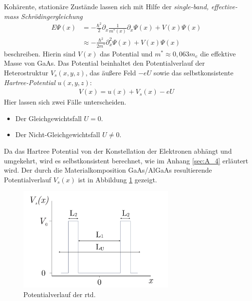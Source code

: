 Kohärente, stationäre Zustände lassen sich mit Hilfe der \emph{single-band, effective-mass Schrödingergleichung} \cite{frensley3}
\begin{equation}
  \begin{aligned}
    E\Psi(x) &= -\frac{\hbar^2}{2}\partial_x \frac{1}{m^*(x)}\partial_x\Psi(x) + V(x)\Psi(x)    \\
    &\approx -\frac{\hbar^2}{2m^*}\partial_x^2\Psi(x) + V(x)\Psi(x)
  \end{aligned}
  \label{eq:schroedinger}
\end{equation}
beschreiben. Hierin sind $V(x)$ das Potential und $m^*\approx 0,063m_e$ die effektive Masse von GaAs. Das Potential beinhaltet den Potentialverlauf der Heterostruktur $V_s(x,y,z)$, das äußere Feld $-eU$ sowie das selbstkonsistente \emph{Hartree-Potential} $u(x,y,z)$:
\begin{align}
  V({x}) = u({x}) + V_s({x}) - eU
\end{align}
Hier lassen sich zwei Fälle unterscheiden.
\begin{itemize}
  \item Der Gleichgewichtsfall $U=0$. %
  \item Der Nicht-Gleichgewichtsfall $U\neq 0$. %
\end{itemize}
Da das Hartree Potential von der Konstellation der Elektronen abhängt und umgekehrt, wird es selbstkonsistent berechnet, wie im Anhang \ref{sec:A_4} erläutert wird.
Der durch die Materialkomposition GaAs/AlGaAs resultierende Potentialverlauf $V_s(x)$ ist in Abbildung \ref{fig:pot1} gezeigt.
\begin{figure}
  \centering
  \includegraphics[width=0.7\textwidth]{files/potential.pdf}
  \caption{Potentialverlauf der \ac{rtd}.}
  \label{fig:pot1}
\end{figure}


